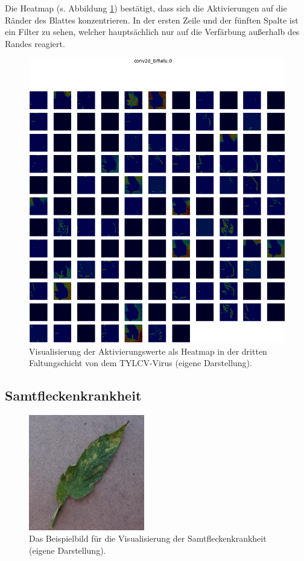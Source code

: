 Die Heatmap (s. Abbildung \ref{yellow_heat_vis}) bestätigt, dass sich die Aktivierungen auf die Ränder des Blattes konzentrieren. In der ersten Zeile und der fünften Spalte ist ein Filter zu sehen, welcher hauptsächlich nur auf die Verfärbung außerhalb des Randes reagiert.

\begin{figure}[h!]
	\centering
	\includegraphics[width=\textwidth]{visualisierungen/yellow/heapmap_mit/conv2d_8.png}
	\caption{Visualisierung der Aktivierungswerte als Heatmap in der dritten Faltungschicht von dem TYLCV-Virus (eigene Darstellung).}
	\label{yellow_heat_vis}
\end{figure}



\newpage
\subsection{Samtfleckenkrankheit}

\begin{figure}
	\centering
	\includegraphics[width=0.45\textwidth]{visualisierungen/leaf_mold/mold_sample.jpg}%
	\caption{Das Beispielbild für die Visualisierung der Samtfleckenkrankheit (eigene Darstellung).}
	\label{mold_sample}
\end{figure}


